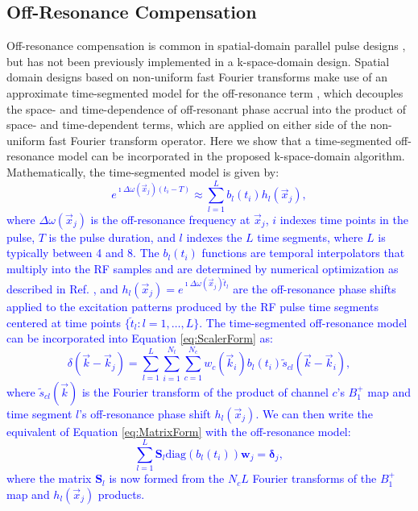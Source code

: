 \subsection*{Off-Resonance Compensation}
Off-resonance compensation is common in spatial-domain parallel pulse designs \cite{Grissom:2006:MRM}, 
but has not been previously implemented in a k-space-domain design.
Spatial domain designs based on non-uniform fast Fourier transforms make use of an approximate time-segmented
model for the off-resonance term \cite{fessler2005toeplitz},
which decouples the space- and time-dependence of off-resonant phase accrual into the product of 
space- and time-dependent terms, which are applied on either side of the non-uniform fast Fourier transform operator. 
Here we show that a time-segmented off-resonance model can be incorporated in the proposed k-space-domain algorithm. 
Mathematically, the time-segmented model is given by:
\textcolor{blue}{
\begin{equation}
e^{\imath \Delta\omega(\vec{x}_j) (t_i-T) }\approx\sum_{l=1}^{L} b_l(t_i) h_{l}(\vec{x}_j) ,
\end{equation}
where $\Delta\omega(\vec{x}_j)$ is the off-resonance frequency at $\vec{x}_j$, 
$i$ indexes time points in the pulse, 
$T$ is the pulse duration,
and $l$ indexes the $L$ time segments, where $L$ is typically between 4 and 8. 
The $b_{l}(t_i)$ functions are temporal interpolators that multiply into the RF samples and are determined by
numerical optimization as described in Ref. \cite{fessler2005toeplitz},
and $h_{l}(\vec{x}_j) = e^{\imath \Delta\omega(\vec{x}_j)\breve{t}_l}$ are the off-resonance phase shifts 
applied to the excitation patterns produced by the RF pulse time segments centered at time points $\{\breve{t}_l: l = 1, \dots, L\}$.
The time-segmented off-resonance model can be incorporated into Equation \ref{eq:ScalerForm} as:
\begin{equation}
	\delta(\vec{k}-\vec{k}_j)=\sum_{l = 1}^L \sum_{i=1}^{N_t}\sum_{c=1}^{N_c} w_c(\vec{k}_i) b_l(t_i) \tilde{s}_{cl} (\vec{k}-\vec{k}_i), 
\end{equation}
where $\tilde{s}_{cl}(\vec{k})$ is the Fourier transform of the product of channel $c$'s $B_1^+$ map and time segment $l$'s 
off-resonance phase shift $h_l(\vec{x}_j)$. 
We can then write the equivalent of Equation \ref{eq:MatrixForm} with the off-resonance model:
\begin{equation}
	\sum_{l=1}^L \bm{S}_l \textrm{diag}(b_{l}(t_i)) \bm{w}_j = \bm{\delta}_j,
\end{equation} 
where the matrix $\bm{S}_l$ is now formed from the $N_c  L$ Fourier transforms of the $B_1^+$ map and $h_l(\vec{x}_j)$ products.}   
